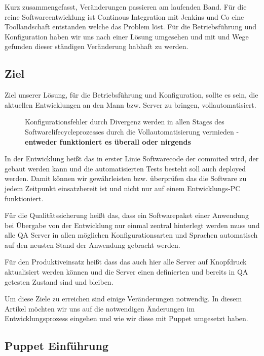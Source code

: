 \documentclass[12pt,a4paper,ngerman]{article}
\begin{document}
Kurz zusammengefasst, Veränderungen passieren am laufenden Band. Für die reine Softwareentwicklung ist Continous Integration mit Jenkins und Co eine Toollandschaft entstanden welche das Problem löst. Für die Betriebsführung und Konfiguration haben wir uns nach einer Lösung umgesehen und mit \cite{puppet} und \cite{chef} Wege gefunden dieser ständigen Veränderung habhaft zu werden.

\subsection{Ziel}

Ziel unserer Lösung, für die Betriebsführung und Konfiguration, sollte es sein, die aktuellen Entwicklungen an den Mann bzw. Server zu bringen, vollautomatisiert. 
\begin{figure}
\vspace{-10pt}
\begin{boxedminipage}{5cm}
Konfigurationsfehler durch Divergenz werden in allen Stages des Softwarelifecycleprozesses durch die Vollautomatisierung vermieden - \textbf{entweder funktioniert es überall oder nirgends}
\end{boxedminipage}
\vspace{-10pt}
\end{figure}
 In der Entwicklung heißt das in erster Linie Softwarecode der commited wird, der gebaut werden kann und die automatisierten Tests besteht soll auch deployed werden. Damit können wir gewährleisten bzw. überprüfen das die Software zu jedem Zeitpunkt einsatzbereit ist und nicht nur auf einem Entwicklungs-PC funktioniert.

Für die Qualitätssicherung heißt das, dass ein Softwarepaket einer Anwendung bei Übergabe von der Entwicklung nur einmal zentral hinterlegt werden muss und alle QA Server in allen möglichen Konfigurationsarten und Sprachen automatisch auf den neusten Stand der Anwendung gebracht werden.

Für den Produktiveinsatz heißt dass das auch hier alle Server auf Knopfdruck aktualisiert werden können und die Server einen definierten und bereits in QA getesten Zustand sind und bleiben. 

Um diese Ziele zu erreichen sind einige Veränderungen notwendig. In diesem Artikel möchten wir uns auf die notwendigen Änderungen im Entwicklungsprozess eingehen und wie wir diese mit Puppet umgesetzt haben.

\subsection{Puppet Einführung}
\end{document}
